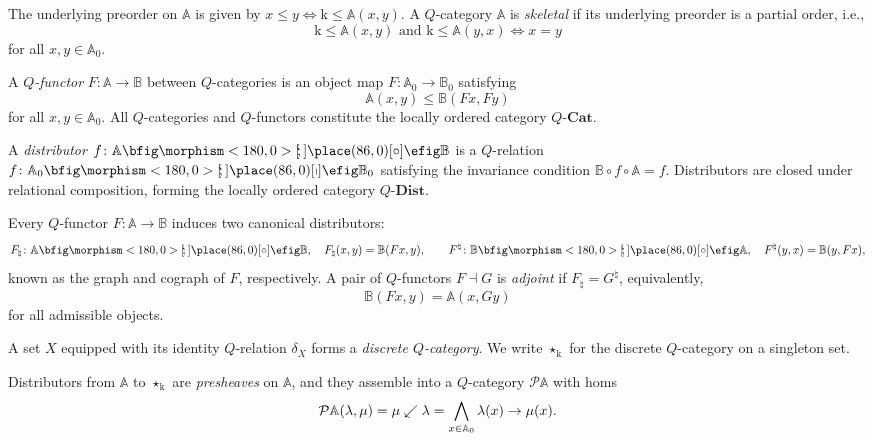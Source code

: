 \documentclass{tac}
\begin{document}
The underlying preorder on \(\mathbb{A}\) is given by \(x\leq y\iff \mathrm{k}\leq\mathbb{A}(x,y)\). A \(Q\)-category \(\mathbb{A}\) is \emph{skeletal} if its underlying preorder is a partial order, i.e.,
\begin{equation*}
\mathrm{k}\leq\mathbb{A}(x,y)\text{ and }\mathrm{k}\leq\mathbb{A}(y,x)\iff x=y
\end{equation*}
for all \(x,y\in\mathbb{A}_0\).

A \emph{\(Q\)-functor} \(F\colon\mathbb{A}\to\mathbb{B}\) between \(Q\)-categories is an object map \(F\colon\mathbb{A}_0\to\mathbb{B}_0\) satisfying
\begin{equation*}
\mathbb{A}(x,y)\leq\mathbb{B}(Fx,Fy)
\end{equation*}
for all \(x,y\in\mathbb{A}_0\). All \(Q\)-categories and \(Q\)-functors constitute the locally ordered category \(Q\text{-}\mathbf{Cat}\).

A \emph{distributor} \(f\colon\mathbb{A}\oto\mathbb{B}\) is a \(Q\)-relation \(f\colon\mathbb{A}_0\nto\mathbb{B}_0\) satisfying the invariance condition \(\mathbb{B}\circ f\circ\mathbb{A}=f\). Distributors are closed under relational composition, forming the locally ordered category \(Q\text{-}\mathbf{Dist}\).

Every \(Q\)-functor \(F\colon\mathbb{A}\to\mathbb{B}\) induces two canonical distributors:
\begin{equation*}
F_{\natural}\colon\mathbb{A}\oto\mathbb{B},\quad F_{\natural}(x,y)=\mathbb{B}(Fx,y),
\qquad
F^{\natural}\colon\mathbb{B}\oto\mathbb{A},\quad F^{\natural}(y,x)=\mathbb{B}(y,Fx),
\end{equation*}
known as the graph and cograph of \(F\), respectively. A pair of \(Q\)-functors \(F\dashv G\) is \emph{adjoint} if \(F_{\natural}=G^{\natural}\), equivalently,
\begin{equation*}
\mathbb{B}(Fx,y)=\mathbb{A}(x,Gy)
\end{equation*}
for all admissible objects.

A set \(X\) equipped with its identity \(Q\)-relation \(\delta_X\) forms a \emph{discrete \(Q\)-category}. We write \(\star_\mathrm{k}\) for the discrete \(Q\)-category on a singleton set.

Distributors from \(\mathbb{A}\) to \(\star_\mathrm{k}\) are \emph{presheaves} on \(\mathbb{A}\), and they assemble into a \(Q\)-category \(\mathcal{P}\mathbb{A}\) with homs
\begin{equation*}
\mathcal{P}\mathbb{A}(\lambda,\mu)=\mu\swarrow\lambda
=\bigwedge_{x\in\mathbb{A}_0}\lambda(x)\rightarrow\mu(x).
\end{equation*}
\end{document}
